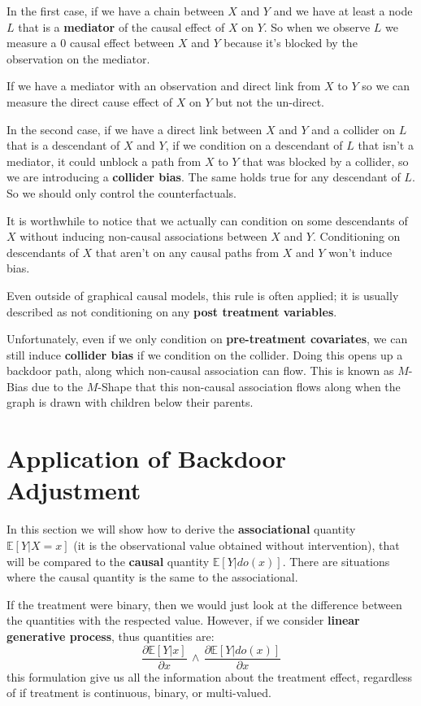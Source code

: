 In the first case, if we have a chain between $X$ and $Y$ and we have at least a
node $L$ that is a \textbf{mediator} of the causal effect of $X$ on $Y$. So when
we observe $L$ we measure a $0$ causal effect between $X$ and $Y$ because it's
blocked by the observation on the mediator.

If we have a mediator with an observation and direct link from $X$ to $Y$ so we
can measure the direct cause effect of $X$ on $Y$ but not the un-direct.

In the second case, if we have a direct link between $X$ and $Y$ and a collider
on $L$ that is a descendant of $X$ and $Y$, if we condition on a descendant of $L$
that isn't a mediator, it could unblock a path from $X$ to $Y$ that was blocked
by a collider, so we are introducing a \textbf{collider bias}. The same holds true
for any descendant of $L$. So we should only control the counterfactuals.

It is worthwhile to notice that we actually can condition on some descendants of
$X$ without inducing non-causal associations between $X$ and $Y$. Conditioning
on descendants of $X$ that aren't on any causal paths from $X$ and $Y$ won't
induce bias.

Even outside of graphical causal models, this rule is often applied; it is usually described
as not conditioning on any \textbf{post treatment variables}.

Unfortunately, even if we only condition on \textbf{pre-treatment covariates}, we
can still induce \textbf{collider bias} if we condition on the collider. Doing
this opens up a backdoor path, along which non-causal association can flow. This
is known as $M$-Bias due to the $M$-Shape that this non-causal association flows
along when the graph is drawn with children below their parents.

\section{Application of Backdoor Adjustment}
In this section we will show how to derive the \textbf{associational} quantity
$\mathbb{E}[Y|X = x]$ (it is the observational value obtained without intervention),
that will be compared to the \textbf{causal} quantity $\mathbb{E}[Y|do(x)]$. There
are situations where the causal quantity is the same to the associational.

If the treatment were binary, then we would just look at the difference between
the quantities with the respected value. However, if we consider \textbf{linear
    generative process}, thus quantities are:
\begin{equation}
    \frac{\partial\mathbb{E}[Y |x]}{\partial x } \, \land \, \frac{\partial\mathbb{E}[Y |do(x)]}{\partial x}
\end{equation}
this formulation give us all the information about the treatment effect, regardless
of if treatment is continuous, binary, or multi-valued.


